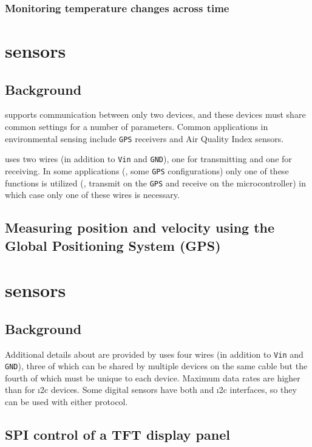\subsubsection{\color{gray} Monitoring temperature changes across time \color{black}}


\section{\color{gray}\uart sensors \color{black}}
\subsection{\color{gray} Background \color{black}}
	\uart supports communication between only two devices, and these devices must share common settings for a number of parameters. %
Common applications in environmental sensing include \texttt{GPS} receivers and Air Quality Index sensors.

\uart uses two wires (in addition to \texttt{Vin} and \texttt{GND}), one for transmitting and one for receiving.
In some applications (\eg, some \texttt{GPS} configurations) only one of these functions is utilized (\eg, transmit on the \texttt{GPS} and receive on the microcontroller) in which case only one of these wires is necessary.
\subsection{\color{gray} Measuring position and velocity using the Global Positioning System (GPS) \color{black}}

\section{\color{gray}\spi sensors \color{black}}
\subsection{\color{gray} Background \color{black}}
	Additional details about \spi are provided by  uses four wires (in addition to \texttt{Vin} and \texttt{GND}), three of which can be shared by multiple devices on the same cable but the fourth of which must be unique to each device.
Maximum data rates are higher than for \i2c devices.
Some digital sensors have both \spi and \i2c interfaces, so they can be used with either protocol.
\subsection{\color{gray} SPI control of a TFT display panel \color{black}}


%
%
%
